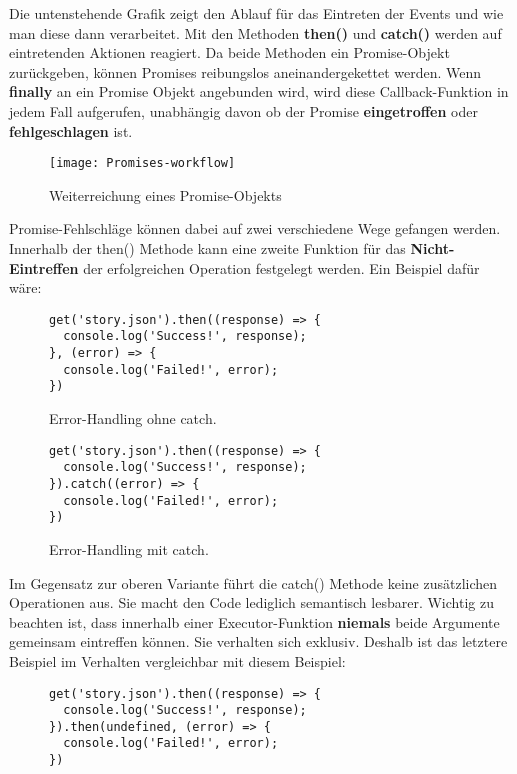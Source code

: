 \noindent
Die untenstehende Grafik zeigt den Ablauf für das Eintreten der Events und wie man diese dann verarbeitet. Mit den Methoden \textbf{then()} und \textbf{catch()} werden auf eintretenden Aktionen reagiert. Da beide Methoden ein Promise-Objekt zurückgeben, können Promises reibungslos aneinandergekettet werden. Wenn \textbf{finally} an ein Promise Objekt angebunden wird, wird diese Callback-Funktion in jedem Fall aufgerufen, unabhängig davon ob der Promise \textbf{eingetroffen} oder \textbf{fehlgeschlagen} ist.


\begin{figure}[H]
\texttt{[image: Promises-workflow]}
\caption{Weiterreichung eines Promise-Objekts \cite{promise-executor}}
\end{figure}

\noindent
Promise-Fehlschläge können dabei auf zwei verschiedene Wege gefangen werden. Innerhalb der then() Methode kann eine zweite Funktion für das \textbf{Nicht-Eintreffen} der erfolgreichen Operation festgelegt werden. Ein Beispiel dafür wäre:

\begin{figure}[H]
\begin{lstlisting}[basicstyle=\small]
get('story.json').then((response) => {
  console.log('Success!', response);
}, (error) => {
  console.log('Failed!', error);
})
\end{lstlisting}
\caption{Error-Handling ohne catch. \cite{callback-vs-promises}}
\end{figure}

\begin{figure}[H]
\begin{lstlisting}[basicstyle=\small]
get('story.json').then((response) => {
  console.log('Success!', response);
}).catch((error) => {
  console.log('Failed!', error);
})
\end{lstlisting}
\caption{Error-Handling mit catch. \cite{callback-vs-promises}}
\end{figure}

\noindent
Im Gegensatz zur oberen Variante führt die catch() Methode keine zusätzlichen Operationen aus. Sie macht den Code lediglich semantisch lesbarer. Wichtig zu beachten ist, dass innerhalb einer Executor-Funktion \textbf{niemals} beide Argumente gemeinsam eintreffen können. Sie verhalten sich exklusiv. Deshalb ist das letztere Beispiel im Verhalten vergleichbar mit diesem Beispiel:

\begin{figure}[H]
\begin{lstlisting}[basicstyle=\small]
get('story.json').then((response) => {
  console.log('Success!', response);
}).then(undefined, (error) => {
  console.log('Failed!', error);
})
\end{lstlisting}
\end{figure}

